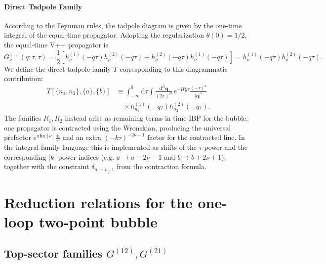 \documentclass[a4paper,12pt]{article}
\newcommand{\FR}[2]{\displaystyle\frac{\,{#1}\,}{#2}}
\def\di{{\mathrm{d}}}
\def\mb{\mathbf}
\def\ii{\mathrm{i}}
\def\to{\rightarrow}
\def\Im{\mathrm{Im}\,}
\begin{document}
\paragraph{Direct Tadpole Family}
According to the Feynman rules, the tadpole diagram is given by the one-time integral of the equal-time propagator. Adopting the regularization $\theta(0)=1/2$, the equal-time V++ propagator is
\begin{equation}
G^{++}_\nu(q;\tau,\tau) = \frac{1}{2}\left[h^{(1)}_\nu(-q\tau)h^{(2)}_\nu(-q\tau) + h^{(2)}_\nu(-q\tau)h^{(1)}_\nu(-q\tau)\right] = h^{(1)}_\nu(-q\tau)h^{(2)}_\nu(-q\tau).
\end{equation}
We define the direct tadpole family $T$ corresponding to this diagrammatic contribution:
\begin{align}
	T[\{n_1,n_2\},\{a\},\{b\}] & \equiv \int_{-\infty}^0 \di\tau \int \FR{\di^D \mb q}{(2\pi)^D}\, e^{-\ii P_0\tau} \frac{(-\tau)^{a}}{|\mb q|^{b}} \nonumber \\
	                                        & \quad\times h_{n_1}^{(1)}(-q\tau)h_{n_2}^{(2)}(-q\tau).
\end{align}
The families $R_1,R_2$ instead arise as remaining terms in time IBP for the bubble: one propagator is contracted using the Wronskian, producing the universal prefactor $e^{\pi \Im [\nu]}\frac{4i}{\pi}$ and an extra $(-k\tau)^{-2\nu-1}$ factor for the contracted line. In the integral-family language this is implemented as shifts of the $\tau$-power and the corresponding $|k|$-power indices (e.g. $a\to a-2\nu-1$ and $b\to b+2\nu+1$), together with the constraint $\delta_{n_i+n_j,1}$ from the contraction formula.

\section{Reduction relations for the one-loop two-point bubble}
\label{sec:reductions}
\subsection{Top-sector families \texorpdfstring{$G^{(12)},G^{(21)}$}{G(12), G(21)}}
\end{document}
